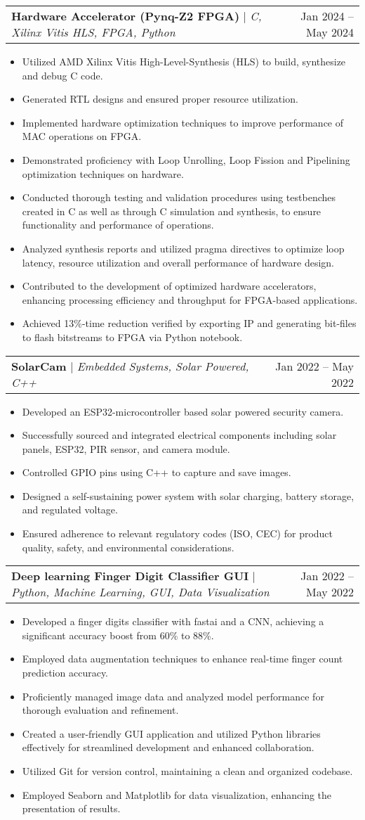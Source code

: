 \documentclass[A4,10pt]{article}
\makeatletter
\newcommand{\resumeItem}[1]{
  \item\small{
    {#1 \vspace{-2pt}}
  }
}
\newcommand{\resumeProjectHeading}[2]{
    \item
    \begin{tabular*}{0.97\textwidth}{l@{\extracolsep{\fill}}r}
      \small#1 & #2 \\
    \end{tabular*}\vspace{-7pt}
}
\newcommand{\resumeItemListStart}{\begin{itemize}}
\newcommand{\resumeItemListEnd}{\end{itemize}\vspace{-5pt}}
\makeatother
\begin{document}
        \resumeProjectHeading
        {\textbf{Hardware Accelerator (Pynq-Z2 FPGA)} $|$ \emph{C, Xilinx Vitis HLS, FPGA, Python}}{Jan 2024 -- May 2024}
        \resumeItemListStart
          \resumeItem{Utilized AMD Xilinx Vitis High-Level-Synthesis (HLS) to build, synthesize and debug C code.}
          \resumeItem{Generated RTL designs and ensured proper resource utilization.}
          \resumeItem{Implemented hardware optimization techniques to improve performance of MAC operations on FPGA.}
          \resumeItem{Demonstrated proficiency with Loop Unrolling, Loop Fission and Pipelining optimization techniques on hardware.}
          \resumeItem{Conducted thorough testing and validation procedures using testbenches created in C as well as through C simulation and synthesis, to ensure functionality and performance of operations.}
          \resumeItem{Analyzed synthesis reports and utilized pragma directives to optimize loop latency, resource utilization and overall performance of hardware design.}
          \resumeItem{Contributed to the development of optimized hardware accelerators, enhancing processing efficiency and throughput for FPGA-based applications.}
          \resumeItem{Achieved 13\%-time reduction verified by exporting IP and generating bit-files to flash bitstreams to FPGA via Python notebook.}
        \resumeItemListEnd

        \resumeProjectHeading
        {\textbf{SolarCam} $|$ \emph{Embedded Systems, Solar Powered, C++}}{Jan 2022 -- May 2022}
        \resumeItemListStart
          \resumeItem{Developed an ESP32-microcontroller based solar powered security camera.}
          \resumeItem{Successfully sourced and integrated electrical components including solar panels, ESP32, PIR sensor, and camera module.}
          \resumeItem{Controlled GPIO pins using C++ to capture and save images.}
          \resumeItem{Designed a self-sustaining power system with solar charging, battery storage, and regulated voltage.}
          \resumeItem{Ensured adherence to relevant regulatory codes (ISO, CEC) for product quality, safety, and environmental considerations.}
        \resumeItemListEnd
        
        \resumeProjectHeading
        {\textbf{Deep learning Finger Digit Classifier GUI} $|$ \emph{Python, Machine Learning, GUI, Data Visualization}}{Jan 2022 -- May 2022}
        \resumeItemListStart
          \resumeItem{Developed a finger digits classifier with fastai and a CNN, achieving a significant accuracy boost from 60\% to 88\%.}
          \resumeItem{Employed data augmentation techniques to enhance real-time finger count prediction accuracy.}
          \resumeItem{Proficiently managed image data and analyzed model performance for thorough evaluation and refinement.}
          \resumeItem{Created a user-friendly GUI application and utilized Python libraries effectively for streamlined development and enhanced collaboration.}
          \resumeItem{Utilized Git for version control, maintaining a clean and organized codebase.}
          \resumeItem{Employed Seaborn and Matplotlib for data visualization, enhancing the presentation of results.}
        \resumeItemListEnd
\end{document}
